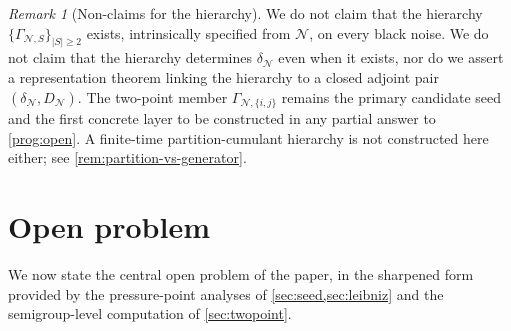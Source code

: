 \documentclass[11pt,reqno]{amsart}
\theoremstyle{plain}
\theoremstyle{definition}
\theoremstyle{remark}
\newtheorem{remark}[theorem]{Remark}
\begin{document}
\begin{remark}[Non-claims for the hierarchy]\label{rem:hierarchy-non-claim}
We do not claim that the hierarchy
$\{\Gamma_{\mathcal N,S}\}_{|S|\ge 2}$ exists, intrinsically
specified from $\mathcal N$, on every black noise. We do not claim
that the hierarchy determines $\delta_{\mathcal N}$ even when it
exists, nor do we assert a representation theorem linking the
hierarchy to a closed adjoint pair
$(\delta_{\mathcal N},D_{\mathcal N})$. The two-point member
$\Gamma_{\mathcal N,\{i,j\}}$ remains the primary candidate seed
and the first concrete layer to be constructed in any partial answer
to \cref{prog:open}. A finite-time partition-cumulant hierarchy is
not constructed here either; see
\cref{rem:partition-vs-generator}.
\end{remark}

\section{Open problem}\label{sec:open}

We now state the central open problem of the paper, in the sharpened
form provided by the pressure-point analyses of
\cref{sec:seed,sec:leibniz} and the semigroup-level computation of
\cref{sec:twopoint}.
\end{document}
